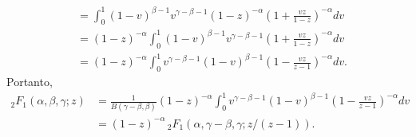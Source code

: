 \documentclass[a4paper,12pt, leqno, answers]{exam}
\begin{document}
\begin{questions}
\begin{parts}
\begin{solution}
\begin{align*}
                &= \int_0^1 (1 - v)^{\beta - 1} v^{\gamma - \beta - 1} (1 - z)^{-\alpha} \left( 1 + \frac{vz}{1 - z} \right)^{-\alpha} dv \\
                &= (1 - z)^{-\alpha} \int_0^1 (1 - v)^{\beta - 1} v^{\gamma - \beta - 1} \left( 1 + \frac{vz}{1 - z} \right)^{-\alpha} dv \\
                &= (1 - z)^{-\alpha} \int_0^1 v^{\gamma - \beta - 1} (1 - v)^{\beta - 1} \left( 1 - \frac{vz}{z - 1} \right)^{-\alpha} dv.
            \end{align*}
            Portanto,
            \begin{align*}
                {}_2F_1(\alpha, \beta, \gamma; z) &= \frac{1}{B(\gamma - \beta, \beta)} (1 - z)^{-\alpha} \int_0^1 v^{\gamma - \beta - 1} (1 - v)^{\beta - 1} \left( 1 - \frac{vz}{z - 1} \right)^{-\alpha} dv \\
                &= (1 - z)^{-\alpha} \,_2F_1(\alpha, \gamma - \beta, \gamma; z / (z - 1)).
            \end{align*}
        \end{solution}


\end{parts}
\end{questions}
\end{document}
